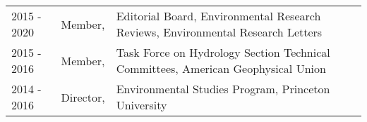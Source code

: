 \documentclass[10pt]{report}
\begin{document}
\begin{longtable}{p{.75in} p{1.1in} p{4.2in}}
2015 - 2020 & Member, & Editorial Board, Environmental Research Reviews, Environmental Research Letters \\ 
2015 - 2016 & Member, & Task Force on Hydrology Section Technical Committees, American Geophysical Union \\ 
2014 - 2016 & Director, & Environmental Studies Program, Princeton University \\

\end{longtable}
\end{document}
